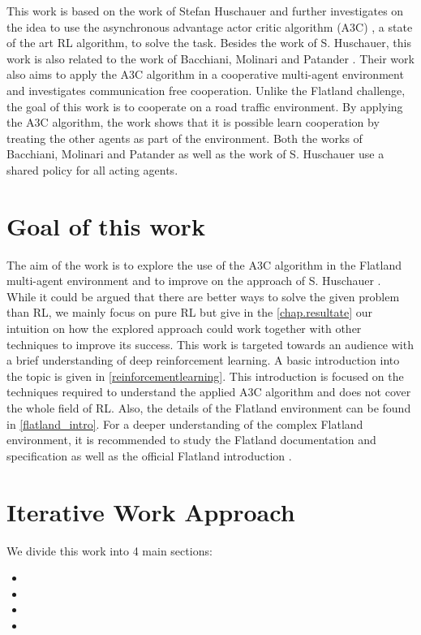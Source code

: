 This work is based on the work of Stefan Huschauer \cite{flatlandstephan} and further investigates on the idea to use the asynchronous advantage actor critic algorithm (A3C) \cite{a3c}, a state of the art RL algorithm, to solve the task.
Besides the work of S. Huschauer, this work is also related to the work of Bacchiani, Molinari and Patander \cite{marltraffica3c}. Their work also aims to apply the A3C algorithm in a cooperative multi-agent environment and investigates communication free cooperation.
Unlike the Flatland challenge, the goal of this work is to cooperate on a road traffic environment. By applying the A3C algorithm, the work shows that it is possible learn cooperation by treating the other agents as part of the environment. Both the works of Bacchiani, Molinari and Patander as well as the work of S. Huschauer use a shared policy for all acting agents.

\section{Goal of this work}\label{zielsetzung}
The aim of the work is to explore the use of the A3C algorithm in the Flatland multi-agent environment and to improve on the approach of S. Huschauer \cite{flatlandstephan}.\\
While it could be argued that there are better ways to solve the given problem than RL, we mainly focus on pure RL but give in the \autoref{chap.resultate} our intuition on how the explored approach could work together with other techniques to improve its success.
This work is targeted towards an audience with a brief understanding of deep reinforcement learning. A basic introduction into the topic is given in \autoref{reinforcementlearning}. This introduction is focused on the techniques required to understand the applied A3C algorithm and does not cover the whole field of RL.
Also, the details of the Flatland environment can be found in \autoref{flatland_intro}. For a deeper understanding of the complex Flatland environment, it is recommended to study the Flatland documentation and specification \cite{flatland_docu} as well as the official Flatland introduction \cite{aicrowd}.

\section{Iterative Work Approach}\label{basic_cons}
We divide this work into 4 main sections:
\begin{itemize}
	\item {}
	\item {}
	\item {}
	\item {}
\end{itemize}

